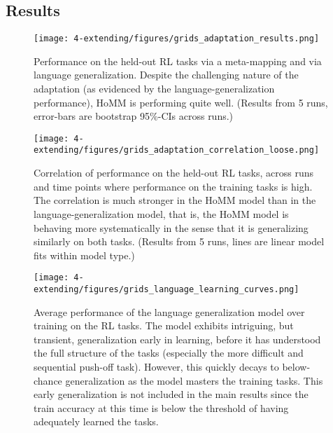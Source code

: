 \subsection{Results}

\begin{figure}[htb]
\centering
\texttt{[image: 4-extending/figures/grids\_adaptation\_results.png]}
\caption[Performance on the held-out RL tasks.]{Performance on the held-out RL tasks via a meta-mapping and via language generalization. Despite the challenging nature of the adaptation (as evidenced by the language-generalization performance), HoMM is performing quite well. (Results from 5 runs, error-bars are bootstrap 95\%-CIs across runs.)} \label{fig:HoMM_RL_results}
\end{figure}

\begin{figure}[htb]
\centering
\texttt{[image: 4-extending/figures/grids\_adaptation\_correlation\_loose.png]}
\caption[Correlation of performance on the held-out RL tasks.]{Correlation of performance on the held-out RL tasks, across runs and time points where performance on the training tasks is high. The correlation is much stronger in the HoMM model than in the language-generalization model, that is, the HoMM model is behaving more systematically in the sense that it is generalizing similarly on both tasks. (Results from 5 runs, lines are linear model fits within model type.)} \label{fig:HoMM_RL_results:correlation}
\end{figure}

\begin{figure}[htb]
\centering
\texttt{[image: 4-extending/figures/grids\_language\_learning\_curves.png]}
\caption[Language generalization model learning curves on the RL tasks.]{Average performance of the language generalization model over training on the RL tasks. The model exhibits intriguing, but transient, generalization early in learning, before it has understood the full structure of the tasks (especially the more difficult and sequential push-off task). However, this quickly decays to below-chance generalization as the model masters the training tasks. This early generalization is not included in the main results since the train accuracy at this time is below the threshold of having adequately learned the tasks.} \label{fig:HoMM_RL_language_learning_curves}
\end{figure}

